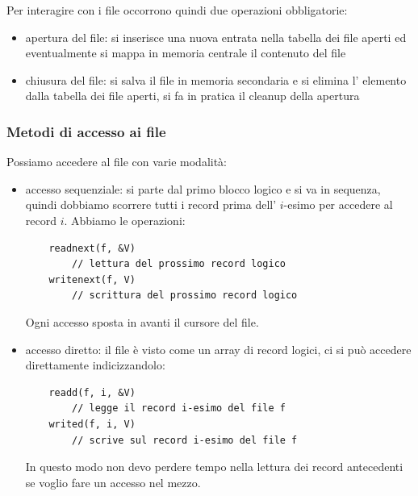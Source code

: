 {Per interagire con i file occorrono quindi due operazioni obbligatorie:
\begin{itemize}
    \item apertura del file: si inserisce una nuova entrata nella tabella dei file aperti ed eventualmente si mappa in memoria centrale il contenuto del file
    \item chiusura del file: si salva il file in memoria secondaria e si elimina l' elemento dalla tabella dei file aperti, si fa in pratica il cleanup della apertura
\end{itemize}

\subsubsection{Metodi di accesso ai file}
Possiamo accedere al file con varie modalità:
\begin{itemize}
    \item accesso sequenziale: si parte dal primo blocco logico e si va in sequenza, quindi dobbiamo scorrere tutti i record prima dell' $i$-esimo per accedere al record $i$.
    Abbiamo le operazioni:
    \begin{verbatim}
    readnext(f, &V)
        // lettura del prossimo record logico
    writenext(f, V)
        // scrittura del prossimo record logico
    \end{verbatim}
    Ogni accesso sposta in avanti il cursore del file.

    \item accesso diretto: il file è visto come un array di record logici, ci si può accedere direttamente indicizzandolo:
    \begin{verbatim}
    readd(f, i, &V)
        // legge il record i-esimo del file f
    writed(f, i, V)
        // scrive sul record i-esimo del file f
    \end{verbatim}
    In questo modo non devo perdere tempo nella lettura dei record antecedenti se voglio fare un accesso nel mezzo.


\end{itemize}}
